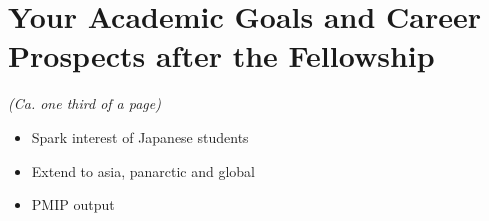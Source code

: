 \documentclass{article}
\begin{document}
\section{Your Academic Goals and Career Prospects after the Fellowship}

    \emph{(Ca. one third of a page)}

    \begin{itemize}
      \item{Spark interest of Japanese students}
      \item{Extend to asia, panarctic and global}
      \item{PMIP output}
    \end{itemize}

\end{document}
